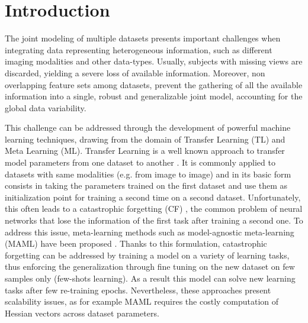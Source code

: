 \section{Introduction}

The joint modeling of multiple datasets presents important challenges when integrating data representing heterogeneous information, such as different imaging modalities and other data-types.
Usually, subjects with missing views are discarded, yielding a severe loss of available information.
Moreover, non overlapping feature sets among datasets, prevent the gathering of all the available information into a single, robust and generalizable joint model, accounting for the global data variability.

This challenge can be addressed through the development of powerful machine learning techniques,  drawing from the domain of Transfer Learning (TL) and Meta Learning (ML).
Transfer Learning is a well known approach to transfer model parameters from one dataset to another \citep{TL}.
It is commonly applied to datasets with same modalities (e.g. from image to image) and in its basic form consists in taking the parameters trained on the first dataset and use them as initialization point for training a second time on a second dataset.
Unfortunately, this often leads to a catastrophic forgetting (CF) \citep{CatastroficForgetting}, the common problem of neural networks that lose the information of the first task after training a second one.
To address this issue, meta-learning methods such as model-agnostic meta-learning (MAML) have been proposed \citep{MAML1}.
Thanks to this formulation, catastrophic forgetting can be addressed by training a model on a variety of learning tasks, thus enforcing the generalization through fine tuning on the new dataset on few samples only (few-shots learning).
As a result this model can solve new learning tasks after few re-training epochs.
Nevertheless, these approaches present scalability issues, as for example MAML requires the costly computation of Hessian vectors across dataset parameters.

